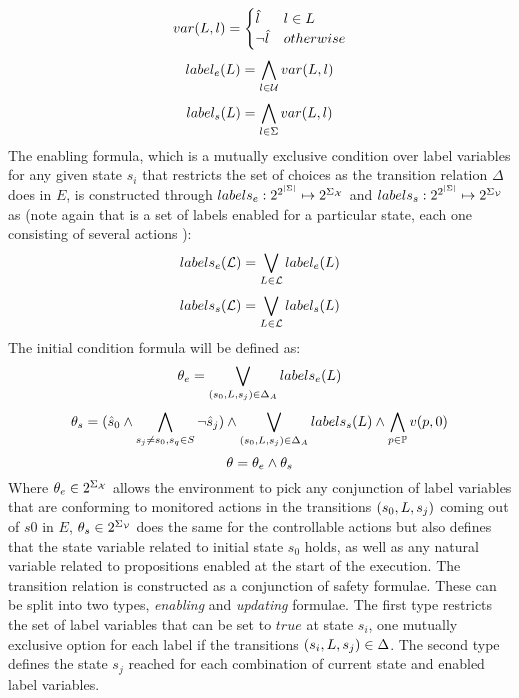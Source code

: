 \[
var(L, l) = \begin{cases}
\hat{l}_{} & l \in L \\
\neg \hat{l}_{} & otherwise
\end{cases}
\]
\[label_e(L) = \bigwedge_{l \in \mathcal{U}}var(L, l)\]
\[label_s(L) = \bigwedge_{l \in \Sigma}var(L, l)\]
The enabling formula, which is a mutually exclusive condition over label variables for any given state $s_i$ that restricts the set of choices as the transition relation $\Delta$ does in $E$, is constructed through $labels_e:2^{2^{|\Sigma|}}\mapsto 2^{\Sigma_{{\mathcal{X}}}}$ and $labels_s:2^{2^{|\Sigma|}}\mapsto 2^{\Sigma_{{\mathcal{V}}}}$ as (note again that  is a set of labels \actionLabel enabled for a particular state, each one consisting of several actions \action):
\[labels_e(\mathcal{L}) = \bigvee_{L \in \mathcal{L}}label_e(L) \]
\[labels_s(\mathcal{L}) = \bigvee_{L \in \mathcal{L}}label_s(L) \]
The initial condition formula will be defined as:
\[{\theta_e} = \bigvee_{(s_0,L,s_j) \in \Delta_A}labels_e(L)\]
\[{\theta_s} = (\hat{s}_{0} \wedge\bigwedge_{s_j \neq s_0, s_q \in S}\neg \hat{s}_{j})  \wedge \bigvee_{(s_0,L,s_j) \in \Delta_A}labels_s(L) \wedge \bigwedge_{p \in \mathbb{P}}v(p,0)\]
\[\theta = {\theta_e} \wedge {\theta_s}\]
Where ${\theta_e} \in 2^{\Sigma_{{\mathcal{X}}}}$ allows the environment to pick any conjunction of label variables that are conforming to monitored actions in the transitions $(s_0, L, s_j)$ coming out of $s0$ in $E$, ${\theta_s}  \in 2^{\Sigma_{{\mathcal{V}}}}$ does the same for the controllable actions but also defines that the state variable related to initial state $s_0$ holds, as well as any natural variable related to propositions enabled at the start of the execution.
The transition relation is constructed as a conjunction of safety formulae. These can be split into two types, \emph{enabling} and \emph{updating} formulae. The first type restricts the set of label variables that can be set to $true$ at state $s_i$, one mutually exclusive option for each label \actionLabel if the transitions $(s_i,L,s_j) \in \Delta$. The second type defines the state $s_j$ reached for each combination of current state and enabled label variables. 

